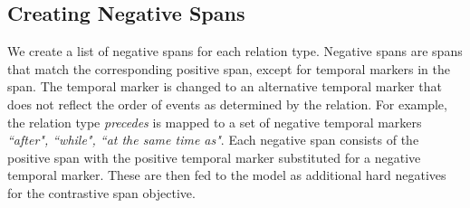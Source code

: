 \subsection{Creating Negative Spans}

We create a list of negative spans for each relation type. Negative spans are
spans that match the corresponding positive span, except for temporal markers
in the span. The temporal marker is changed to an alternative temporal marker
that does not reflect the order of events as determined by the relation. For
example, the relation type \textit{precedes} is mapped to a set of negative
temporal markers \textit{``after", ``while", ``at the same time as"}. Each
negative span consists of the positive span with the positive temporal marker
substituted for a negative temporal marker. These are then fed to the model
as additional hard negatives for the contrastive span objective.


